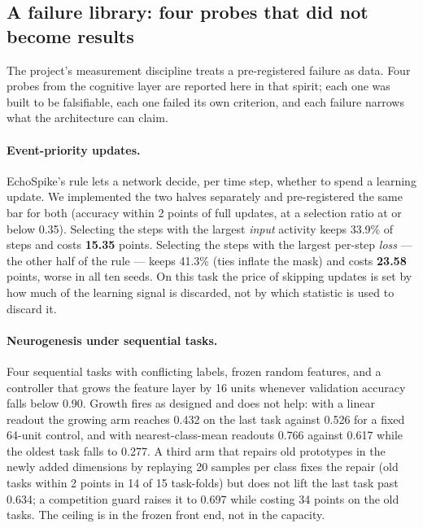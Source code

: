 \documentclass[11pt]{article}
\begin{document}
\subsection{A failure library: four probes that did not become results}
\label{sec:failure-library}

The project's measurement discipline treats a pre-registered failure as data.
Four probes from the cognitive layer are reported here in that spirit; each one
was built to be falsifiable, each one failed its own criterion, and each failure
narrows what the architecture can claim.

\paragraph{Event-priority updates.} EchoSpike's rule lets a network decide, per
time step, whether to spend a learning update. We implemented the two halves
separately and pre-registered the same bar for both (accuracy within 2 points of
full updates, at a selection ratio at or below 0.35). Selecting the steps with
the largest \emph{input} activity keeps 33.9\% of steps and costs
\textbf{15.35} points. Selecting the steps with the largest per-step \emph{loss}
--- the other half of the rule --- keeps 41.3\% (ties inflate the mask) and costs
\textbf{23.58} points, worse in all ten seeds. On this task the price of skipping
updates is set by how much of the learning signal is discarded, not by which
statistic is used to discard it.

\paragraph{Neurogenesis under sequential tasks.} Four sequential tasks with
conflicting labels, frozen random features, and a controller that grows the
feature layer by 16 units whenever validation accuracy falls below 0.90. Growth
fires as designed and does not help: with a linear readout the growing arm
reaches 0.432 on the last task against 0.526 for a fixed 64-unit control, and
with nearest-class-mean readouts 0.766 against 0.617 while the oldest task falls
to 0.277. A third arm that repairs old prototypes in the newly added dimensions
by replaying 20 samples per class fixes the repair (old tasks within 2 points in
14 of 15 task-folds) but does not lift the last task past 0.634; a competition
guard raises it to 0.697 while costing 34 points on the old tasks. The ceiling is
in the frozen front end, not in the capacity.
\end{document}
